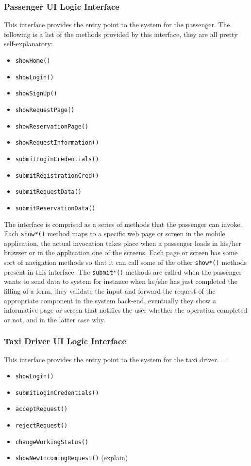 \subsubsection{Passenger UI Logic Interface}
This interface provides the entry point to the system for the passenger.
The following is a list of the methods provided by this interface, they are all pretty self-explanatory:
\begin{itemize}
	\item \texttt{showHome()}
	\item \texttt{showLogin()}
	\item \texttt{showSignUp()}
	\item \texttt{showRequestPage()}
	\item \texttt{showReservationPage()}
	\item \texttt{showRequestInformation()}
	\item \texttt{submitLoginCredentials()}
	\item \texttt{submitRegistrationCred()}
	\item \texttt{submitRequestData()}
	\item \texttt{submitReservationData()}
\end{itemize}
The interface is comprised as a series of methods that the passenger can invoke. Each \texttt{show*()} method maps to a specific web page or screen in the mobile application, the actual invocation takes place when a passenger loads in his/her browser or in the application one of the screens. Each page or screen has some sort of navigation methods so that it can call some of the other \texttt{show*()} methods present in this interface.
The \texttt{submit*()} methods are called when the passenger wants to send data to system for instance when he/she has just completed the filling of a form, they validate the input and forward the request of the appropriate component in the system back-end, eventually they show a informative page or screen that notifies the user whether the operation completed or not, and in the latter case why. 
\subsubsection{Taxi Driver UI Logic Interface}
This interface provides the entry point to the system for the taxi driver.
...
\begin{itemize}
	\item \texttt{showLogin()}
	\item \texttt{submitLoginCredentials()}
	\item \texttt{acceptRequest()}
	\item \texttt{rejectRequest()}
	\item \texttt{changeWorkingStatus()}
	\item \texttt{showNewIncomingRequest()} (explain)
\end{itemize}
